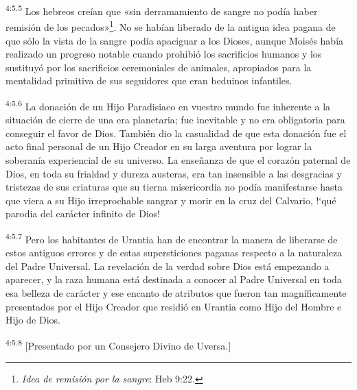 \par
\textsuperscript{4:5.5} Los hebreos creían que «sin derramamiento de sangre no podía haber remisión de los pecados»\footnote{\textit{Idea de remisión por la sangre}: Heb 9:22.}. No se habían liberado de la antigua idea pagana de que sólo la vista de la sangre podía apaciguar a los Dioses, aunque Moisés había realizado un progreso notable cuando prohibió los sacrificios humanos y los sustituyó por los sacrificios ceremoniales de animales, apropiados para la mentalidad primitiva de sus seguidores que eran beduinos infantiles.

\par
\textsuperscript{4:5.6} La donación de un Hijo Paradisiaco en vuestro mundo fue inherente a la situación de cierre de una era planetaria; fue inevitable y no era obligatoria para conseguir el favor de Dios. También dio la casualidad de que esta donación fue el acto final personal de un Hijo Creador en su larga aventura por lograr la soberanía experiencial de su universo. La enseñanza de que el corazón paternal de Dios, en toda su frialdad y dureza austeras, era tan insensible a las desgracias y tristezas de sus criaturas que su tierna misericordia no podía manifestarse hasta que viera a su Hijo irreprochable sangrar y morir en la cruz del Calvario, !`qué parodia del carácter infinito de Dios!

\par
\textsuperscript{4:5.7} Pero los habitantes de Urantia han de encontrar la manera de liberarse de estos antiguos errores y de estas supersticiones paganas respecto a la naturaleza del Padre Universal. La revelación de la verdad sobre Dios está empezando a aparecer, y la raza humana está destinada a conocer al Padre Universal en toda esa belleza de carácter y ese encanto de atributos que fueron tan magníficamente presentados por el Hijo Creador que residió en Urantia como Hijo del Hombre e Hijo de Dios.

\par
\textsuperscript{4:5.8} [Presentado por un Consejero Divino de Uversa.]